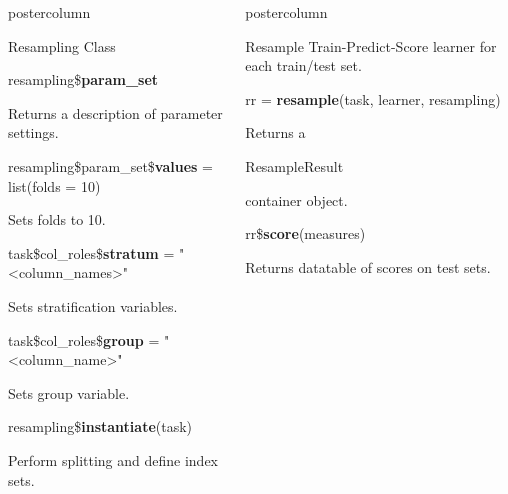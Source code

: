 \documentclass{beamer}
\newlength{\columnheight} %
\newcommand{\codeinline}[1]{\begin{codeboxinline}#1\end{codeboxinline}}
\begin{document}
\begin{withoutheader}
\begin{frame}[fragile]{}
\begin{columns}
\begin{column}{.245\textwidth}
\begin{beamercolorbox}[center]{postercolumn}
\begin{minipage}{.98\textwidth}
{\begin{myblock}{Resampling Class}
							\vspace{1em}
							\begin{codebox}
								resampling\$\textbf{param\_set}
							\end{codebox}
							Returns a description of parameter settings.
							\\
							\begin{codebox}
								{\footnotesize resampling\$param\_set\$\textbf{values} = list(folds = 10)}
							\end{codebox}
							Sets folds to 10.
							\\
							\begin{codebox}
								task\$col\_roles\$\textbf{stratum} = "<column\_names>"
							\end{codebox}
							Sets stratification variables.
							\\
							\begin{codebox}
								task\$col\_roles\$\textbf{group} = "<column\_name>"
							\end{codebox}
							Sets group variable.
							\\
							\begin{codebox}
								resampling\$\textbf{instantiate}(task)
							\end{codebox}
                            Perform splitting and define index sets.
						\end{myblock}
					\vfill}
				\end{minipage}
			\end{beamercolorbox}
		\end{column}
		\begin{column}{.245\textwidth}
			\begin{beamercolorbox}[center]{postercolumn}
				\begin{minipage}{.98\textwidth}
					\parbox[t][\columnheight]{\textwidth}{
						\begin{myblock}{Resample}
                            Train-Predict-Score learner for each train/test set.
							\\
							\begin{codebox}
								rr = \textbf{resample}(task, learner, resampling)
							\end{codebox}
							Returns a \codeinline{ResampleResult} container object.
							\\
							\begin{codebox}
								rr\$\textbf{score}(measures)
							\end{codebox}
							Returns datatable of scores on test sets.

\end{myblock}}
\end{minipage}
\end{beamercolorbox}
\end{column}
\end{columns}
\end{frame}
\end{withoutheader}
\end{document}
